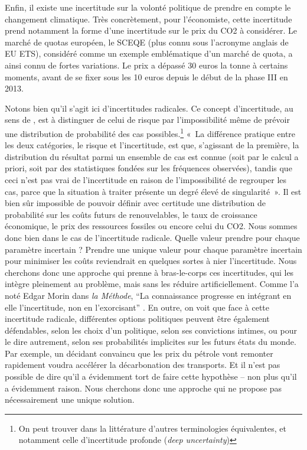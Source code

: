 Enfin, il existe une incertitude sur la volonté politique de prendre en compte le changement climatique. Très concrètement, pour l’économiste, cette incertitude prend notamment la forme d’une incertitude sur le prix du CO2 à considérer. Le marché de quotas européen, le SCEQE (plus connu sous l’acronyme anglais de EU ETS), considéré comme un exemple emblématique d’un marché de quota, a ainsi connu de fortes variations. Le prix a dépassé 30 euros la tonne à certains moments, avant de se fixer sous les 10 euros depuis le début de la phase III en 2013. 

Notons bien qu’il s’agit ici d’incertitudes radicales. Ce concept d’incertitude, au sens de \citet{Knight1921}, est à distinguer de celui de risque par l’impossibilité même de prévoir une distribution de probabilité des cas possibles.\footnote{On peut trouver dans la littérature d’autres terminologies équivalentes, et notamment celle d'incertitude profonde (\textit{deep uncertainty})}
«~La différence pratique entre les deux catégories, le risque et l’incertitude, est que, s’agissant de la première, la distribution du résultat parmi un ensemble de cas est connue (soit par le calcul a priori, soit par des statistiques fondées sur les fréquences observées), tandis que ceci n’est pas vrai de l’incertitude en raison de l’impossibilité de regrouper les cas, parce que la situation à traiter présente un degré élevé de singularité~»\citep[p. 233]{Knight1921}.
Il est bien sûr impossible de pouvoir définir avec certitude une distribution de probabilité sur les coûts futurs de renouvelables, le taux de croissance économique, le prix des ressources fossiles ou encore celui du CO2. Nous sommes donc bien dans le cas de l’incertitude radicale. Quelle valeur prendre pour chaque paramètre incertain ? Prendre une unique valeur pour chaque paramètre incertain pour minimiser les coûts reviendrait en quelques sortes à nier l’incertitude. Nous cherchons donc une approche qui prenne à bras-le-corps ces incertitudes, qui les intègre pleinement au problème, mais sans les réduire artificiellement. Comme l’a noté Edgar Morin dans \textit{la Méthode}, “La connaissance progresse en intégrant en elle l'incertitude, non en l'exorcisant” \citep{Morin2008}.
En outre, on voit que face à cette incertitude radicale, différentes options politiques peuvent être également défendables, selon les choix d’un politique, selon ses convictions intimes, ou pour le dire autrement, selon ses probabilités implicites sur les futurs états du monde.  Par exemple, un décidant convaincu que les prix du pétrole vont remonter rapidement voudra accélérer la décarbonation des transports. Et il n’est pas possible de dire qu’il a évidemment tort de faire cette hypothèse – non plus qu’il a évidemment raison. Nous cherchons donc une approche qui ne propose pas nécessairement une unique solution.

